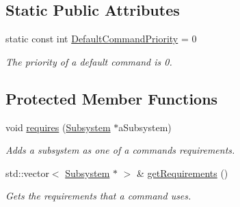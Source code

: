 \subsection*{Static Public Attributes}
\begin{DoxyCompactItemize}
\item 
\mbox{\label{classlib_iterative_robot_1_1_command_a37cc89119a9f76d0dda57ea21c877c7c}} 
static const int \mbox{\hyperlink{classlib_iterative_robot_1_1_command_a37cc89119a9f76d0dda57ea21c877c7c}{Default\+Command\+Priority}} = 0
\begin{DoxyCompactList}\small\item\em The priority of a default command is 0. \end{DoxyCompactList}\end{DoxyCompactItemize}
\subsection*{Protected Member Functions}
\begin{DoxyCompactItemize}
\item 
void \mbox{\hyperlink{classlib_iterative_robot_1_1_command_ad7b7f328974f5f17a2a4b1593b6c9eb5}{requires}} (\mbox{\hyperlink{classlib_iterative_robot_1_1_subsystem}{Subsystem}} $\ast$a\+Subsystem)
\begin{DoxyCompactList}\small\item\em Adds a subsystem as one of a command\textquotesingle{}s requirements. \end{DoxyCompactList}\item 
std\+::vector$<$ \mbox{\hyperlink{classlib_iterative_robot_1_1_subsystem}{Subsystem}} $\ast$ $>$ \& \mbox{\hyperlink{classlib_iterative_robot_1_1_command_a447ba6e394f165c6d358471a8bbdc76a}{get\+Requirements}} ()
\begin{DoxyCompactList}\small\item\em Gets the requirements that a command uses. \end{DoxyCompactList}\end{DoxyCompactItemize}
